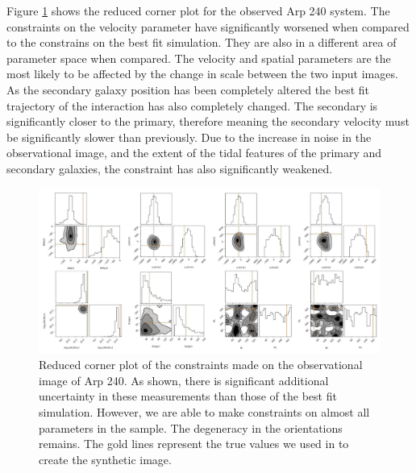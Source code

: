 Figure \ref{fig:obs_corner_plot} shows the reduced corner plot for the observed Arp 240 system. The constraints on the velocity parameter have significantly worsened when compared to the constrains on the best fit simulation. They are also in a different area of parameter space when compared. The velocity and spatial parameters are the most likely to be affected by the change in scale between the two input images. As the secondary galaxy position has been completely altered the best fit trajectory of the interaction has also completely changed. The secondary is significantly closer to the primary, therefore meaning the secondary velocity must be significantly slower than previously. Due to the increase in noise in the observational image, and the extent of the tidal features of the primary and secondary galaxies, the constraint has also significantly weakened.

\begin{figure}
\centering
\includegraphics[width=\textwidth]{Chapter1/figures/Arp240_obs-red-corner.pdf}
\caption[Reduced corner plot of the constraints made on the observational image of Arp 240.]{Reduced corner plot of the constraints made on the observational image of Arp 240. As shown, there is significant additional uncertainty in these measurements than those of the best fit simulation. However, we are able to make constraints on almost all parameters in the sample. The degeneracy in the orientations remains. The gold lines represent the true values we used in to create the synthetic image.}
\label{fig:obs_corner_plot}
\end{figure}

